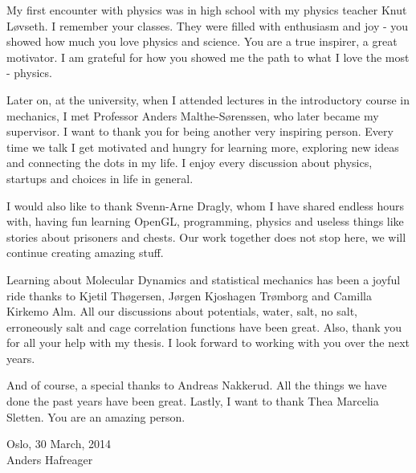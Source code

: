 My first encounter with physics was in high school with my physics teacher Knut L{\o}vseth. I remember your classes. They were filled with enthusiasm and joy - you showed how much you love physics and science. You are a true inspirer, a great motivator. I am grateful for how you showed me the path to what I love the most - physics.

Later on, at the university, when I attended lectures in the introductory course in mechanics, I met Professor Anders Malthe-S{\o}renssen, who later became my supervisor. I want to thank you for being another very inspiring person. Every time we talk I get motivated and hungry for learning more, exploring new ideas and connecting the dots in my life. I enjoy every discussion about physics, startups and choices in life in general. 

I would also like to thank Svenn-Arne Dragly, whom I have shared endless hours with, having fun learning OpenGL, programming, physics and useless things like stories about prisoners and chests. Our work together does not stop here, we will continue creating amazing stuff.

Learning about Molecular Dynamics and statistical mechanics has been a joyful ride thanks to Kjetil Th{\o}gersen, J{\o}rgen Kjoshagen Tr{\o}mborg and Camilla Kirkemo Alm. All our discussions about potentials, water, salt, no salt, erroneously salt and cage correlation functions have been great. Also, thank you for all your help with my thesis. I look forward to working with you over the next years.

And of course, a special thanks to Andreas Nakkerud. All the things we have done the past years have been great. Lastly, I want to thank Thea Marcelia Sletten. You are an amazing person.

\raggedleft Oslo, 30 March, 2014\\
\raggedleft Anders Hafreager